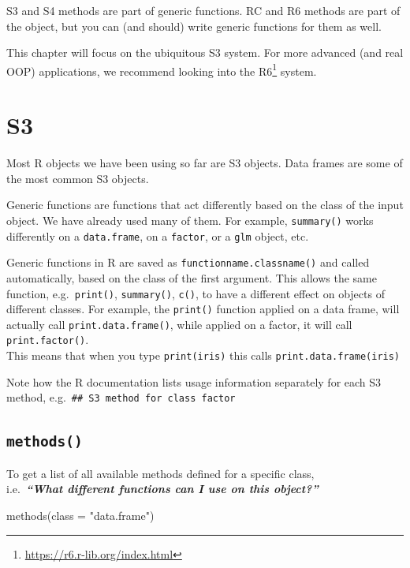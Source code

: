 \documentclass[
]{book}
\newenvironment{Shaded}{\begin{snugshade}}{\end{snugshade}}
\newcommand{\AttributeTok}[1]{\textcolor[rgb]{0.77,0.63,0.00}{#1}}
\newcommand{\FunctionTok}[1]{\textcolor[rgb]{0.00,0.00,0.00}{#1}}
\newcommand{\NormalTok}[1]{#1}
\newcommand{\StringTok}[1]{\textcolor[rgb]{0.31,0.60,0.02}{#1}}
\DeclareRobustCommand{\href}[2]{#2\footnote{\url{#1}}}
\begin{document}
S3 and S4 methods are part of generic functions. RC and R6 methods are part of the object, but you can (and should) write generic functions for them as well.

This chapter will focus on the ubiquitous S3 system. For more advanced (and real OOP) applications, we recommend looking into the \href{https://r6.r-lib.org/index.html}{R6} system.

\hypertarget{s3}{%
\section{S3}\label{s3}}

Most R objects we have been using so far are S3 objects. Data frames are some of the most common S3 objects.

Generic functions are functions that act differently based on the class of the input object. We have already used many of them. For example, \texttt{summary()} works differently on a \texttt{data.frame}, on a \texttt{factor}, or a \texttt{glm} object, etc.

Generic functions in R are saved as \texttt{functionname.classname()} and called automatically, based on the class of the first argument. This allows the same function, e.g.~\texttt{print()}, \texttt{summary()}, \texttt{c()}, to have a different effect on objects of different classes.
For example, the \texttt{print()} function applied on a data frame, will actually call \texttt{print.data.frame()}, while applied on a factor, it will call \texttt{print.factor()}.\\
This means that when you type \texttt{print(iris)} this calls \texttt{print.data.frame(iris)}

Note how the R documentation lists usage information separately for each S3 method, e.g.~\texttt{\#\#\ S3\ method\ for\ class\ \textquotesingle{}factor\textquotesingle{}}

\hypertarget{s3methods}{%
\subsection{\texorpdfstring{\texttt{methods()}}{methods()}}\label{s3methods}}

To get a list of all available methods defined for a specific class,\\
i.e.~\textbf{\emph{``What different functions can I use on this object?''}}

\begin{Shaded}
\begin{Highlighting}[]
\FunctionTok{methods}\NormalTok{(}\AttributeTok{class =} \StringTok{"data.frame"}\NormalTok{)}
\end{Highlighting}
\end{Shaded}
\end{document}
